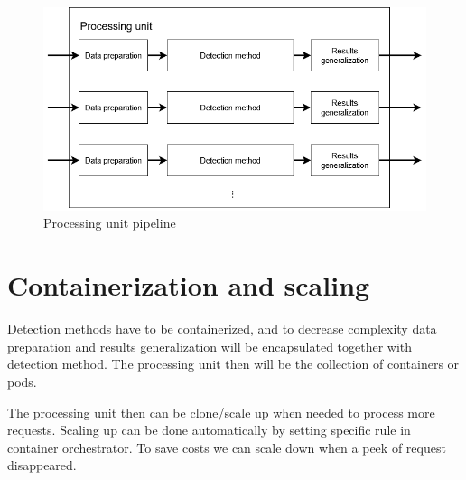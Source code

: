 \begin{figure}[H]
    \centering
    \includegraphics[width=.65\linewidth]{other-fig/framework_architecture_processing_unit.png}        
    \caption{Processing unit pipeline}
\label{fig:framework_architecture_processing_unit}
\end{figure}

\section{Containerization and scaling}

Detection methods have to be containerized, and to decrease complexity data preparation and results generalization will be encapsulated together with detection method. The processing unit then will be the collection of containers or pods.

The processing unit then can be clone/scale up when needed to process more requests. Scaling up can be done automatically by setting specific rule in container orchestrator. To save costs we can scale down when a peek of request disappeared.



